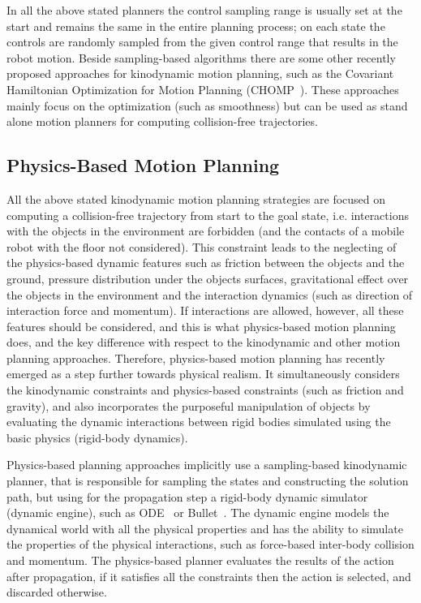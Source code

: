 \documentclass[twocolumn]{svjour3}          %
\begin{document}
 In all the above stated planners the control sampling range is usually set at the start and remains the same in the entire planning process; on each state the controls are randomly sampled from the 
given control range that results in the robot motion. Beside sampling-based algorithms there are some other recently proposed approaches for kinodynamic motion planning, such as the Covariant 
Hamiltonian Optimization for Motion Planning (CHOMP~\cite{zucker2013}). These approaches mainly focus on the optimization (such as smoothness) but can be used as stand alone motion planners for 
computing collision-free trajectories. 


\subsection{Physics-Based Motion Planning}

All the above stated kinodynamic motion planning strategies are focused on computing a collision-free trajectory from start to the goal state, i.e. interactions with the objects in the environment are forbidden (and the contacts of a mobile robot with the floor not considered). This constraint leads to the neglecting of the physics-based dynamic features such as friction between the objects and the ground, pressure distribution under the objects surfaces, gravitational effect over the objects in the environment and the interaction dynamics (such as direction of interaction force and momentum). 
If interactions are allowed, however, all these features should be considered, and this is what physics-based motion planning does, and the key difference with respect to the kinodynamic and other 
motion planning approaches. Therefore, physics-based motion planning has recently emerged as a step further towards physical realism. 
It simultaneously considers the kinodynamic constraints and physics-based constraints (such as friction 
and gravity), and also incorporates the purposeful manipulation of objects by evaluating the dynamic interactions between rigid bodies  simulated using the basic physics (rigid-body dynamics).

Physics-based  planning approaches implicitly use a sampling-based kinodynamic planner, that is responsible for sampling the states and constructing the solution path, but using for the propagation step a 
rigid-body dynamic simulator (dynamic engine), such as ODE~\cite{OpenDE2007} or Bullet~\cite{bullet2013}. The dynamic engine models the dynamical world with all the physical properties and has the 
ability to simulate the properties of the physical interactions, such as force-based inter-body collision and momentum. The physics-based planner evaluates the results of the action after propagation, 
if it satisfies all the constraints then the action is selected, and discarded otherwise. 
\end{document}
